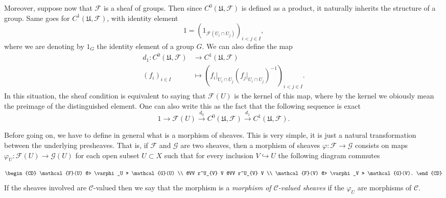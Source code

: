     Moreover, suppose now that $\mathcal{F}$ is a sheaf of groups. Then since $C^0(\mathfrak{U},\mathcal{F})$ is defined as a product, it naturally inherits the structure of a group. Same goes for $C^1(\mathfrak{U},\mathcal{F})$, with identity element
    \begin{equation*}
      1=(1_{\mathcal{F}(U_i\cap U_j)})_{i<j \in I},
    \end{equation*}
where we are denoting by $1_G$ the identity element of a group $G$. We can also define the map
  \begin{align*}
    d_1: C^0(\mathfrak{U},\mathcal{F})&\longrightarrow C^1(\mathfrak{U},\mathcal{F})\\ 
    (f_{i})_{i \in I} &\longmapsto (f_{i}|_{U_i \cap U_j}(f_{j}|_{U_i \cap U_j})^{-1})_{i<j \in I}.
    \end{align*}
    In this situation, the sheaf condition is equivalent to saying that $\mathcal{F}(U)$ is the kernel of this map, where by the kernel we obiously mean the preimage of the distinguished element. One can also write this as the fact that the following sequence is exact
    \begin{equation*}
      1\rightarrow \mathcal{F}(U) \overset{d_0}{\rightarrow} C^0(\mathfrak{U},\mathcal{F}) \overset{d_1}{\rightarrow} C^1(\mathfrak{U},\mathcal{F}).
    \end{equation*}

    Before going on, we have to define in general what is a morphism of sheaves. This is very simple, it is just a natural transformation between the underlying presheaves. That is, if $\mathcal{F}$ and $\mathcal{G}$ are two sheaves, then a morphism of sheaves $\varphi:\mathcal{F} \rightarrow \mathcal{G}$ consists on maps $\varphi_U: \mathcal{F}(U) \rightarrow \mathcal{G}(U)$ for each open subset $U\subset X$ such that for every inclusion $V\hookrightarrow U$ the following diagram commutes

    \begin{equation*}
    \begin{CD}
      \mathcal{F}(U) @> \varphi_U >> \mathcal{G}(U) \\
      @VV r^U_{V} V   @VV r^U_{V} V \\
      \mathcal{F}(V) @> \varphi_V >> \mathcal{G}(V).
    \end{CD}
    \end{equation*}
    If the sheaves involved are $\mathcal{C}$-valued then we say that the morphism is a \emph{morphism of  $\mathcal{C}$-valued sheaves} if the $\varphi_U$ are morphisms of $\mathcal{C}$.

